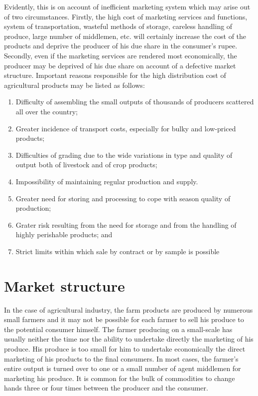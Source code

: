 \documentclass[11pt,]{book}
\providecommand{\tightlist}{%
  \setlength{\itemsep}{0pt}\setlength{\parskip}{0pt}}
\theoremstyle{definition}
\theoremstyle{definition}
\theoremstyle{definition}
\theoremstyle{remark}
\begin{document}
Evidently, this is on account of inefficient marketing system which may
arise out of two circumstances. Firstly, the high cost of marketing
services and functions, system of transportation, wasteful methods of
storage, careless handling of produce, large number of middlemen, etc.
will certainly increase the cost of the products and deprive the
producer of his due share in the consumer's rupee. Secondly, even if the
marketing services are rendered most economically, the producer may be
deprived of his due share on account of a defective market structure.
Important reasons responsible for the high distribution cost of
agricultural products may be listed as follows:

\begin{enumerate}
\def\labelenumi{\arabic{enumi}.}
\tightlist
\item
  Difficulty of assembling the small outputs of thousands of producers
  scattered all over the country;
\item
  Greater incidence of transport costs, especially for bulky and
  low-priced products;
\item
  Difficulties of grading due to the wide variations in type and quality
  of output both of livestock and of crop products;
\item
  Impossibility of maintaining regular production and supply.
\item
  Greater need for storing and processing to cope with season quality of
  production;
\item
  Grater risk resulting from the need for storage and from the handling
  of highly perishable products; and
\item
  Strict limits within which sale by contract or by sample is possible
\end{enumerate}

\section{Market structure}\label{market-structure}

In the case of agricultural industry, the farm products are produced by
numerous small farmers and it may not be possible for each farmer to
sell his produce to the potential consumer himself. The farmer producing
on a small-scale has usually neither the time nor the ability to
undertake directly the marketing of his produce. His produce is too
small for him to undertake economically the direct marketing of his
products to the final consumers. In most cases, the farmer's entire
output is turned over to one or a small number of agent middlemen for
marketing his produce. It is common for the bulk of commodities to
change hands three or four times between the producer and the consumer.
\end{document}
